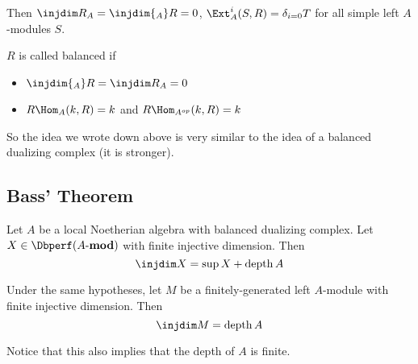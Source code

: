 \documentclass[12pt]{article}
\newcommand*{\Amod}{A\text{-}\mathbf{mod}}
\DeclareMathOperator{\depth}{depth}
\begin{document}
Then $\injdim R_A=\injdim {_A}R=0$, $\Ext^i_A(S,R)=\delta_{i=0}T$ for all simple left $A$-modules $S$.

\begin{defn}
	$R$ is called balanced if 
	\begin{itemize}
		\item $\injdim {_A}R=\injdim R_A=0$
		\item $R\Hom_A(k,R)=k$ and $R\Hom_{A^{op}}(k,R)=k$
	\end{itemize}
\end{defn}

So the idea we wrote down above is very similar to the idea of a balanced dualizing complex (it is stronger).

\subsection{Bass' Theorem}
\begin{thm}[Bass]
	Let $A$ be a local Noetherian algebra with balanced dualizing complex. Let $X\in\Dbperf(\Amod)$ with finite injective dimension. Then 
	\[\injdim X=\sup X+\depth A\]
\end{thm}
\begin{cor}
	Under the same hypotheses, let $M$ be a finitely-generated left $A$-module with finite injective dimension. Then 
	\[\injdim M=\depth A\]
\end{cor}
\begin{rmk}
	Notice that this also implies that the depth of $A$ is finite.
\end{rmk}
\end{document}
